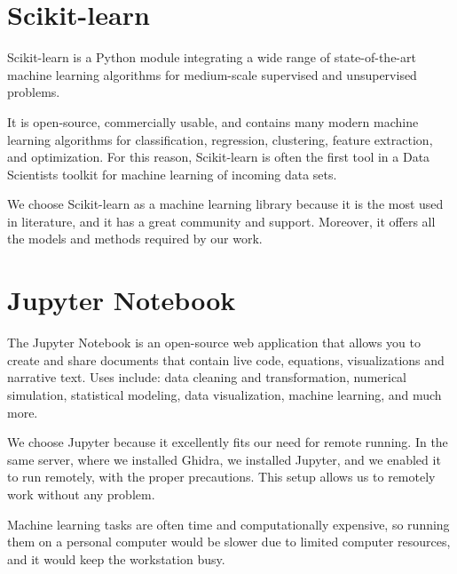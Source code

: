 \section{Scikit-learn}
Scikit-learn \cite{scikit-learn} is a Python module integrating a wide range of state-of-the-art machine learning algorithms for medium-scale supervised and unsupervised problems. 

It is open-source, commercially usable, and contains many modern machine learning algorithms for classification, regression, clustering, feature extraction, and optimization.
For this reason, Scikit-learn is often the first tool in a Data Scientists toolkit for machine learning of incoming data sets. 

We choose Scikit-learn as a machine learning library because it is the most used in literature, and it has a great community and support. Moreover, it offers all the models and methods required by our work. 
\section{Jupyter Notebook}

The Jupyter Notebook  \cite{jupyter} is an open-source web application that allows you to create and share documents that contain live code, equations, visualizations and narrative text. Uses include: data cleaning and transformation, numerical simulation, statistical modeling, data visualization, machine learning, and much more.

We choose Jupyter because it excellently fits our need for remote running. In the same server, where we installed Ghidra, we installed Jupyter, and we enabled it to run remotely, with the proper precautions. This setup allows us to remotely work without any problem. 

Machine learning tasks are often time and computationally expensive, so running them on a personal computer would be slower due to limited computer resources, and it would keep the workstation busy.
